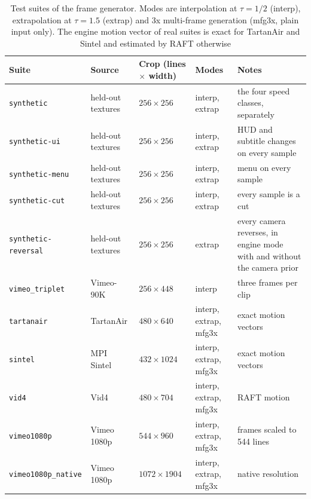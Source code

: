 \begin{table}[!htbp]
\caption{Test suites of the frame generator. Modes are interpolation at $\tau=1/2$ (interp), extrapolation at $\tau=1.5$ (extrap) and 3x multi-frame generation (mfg3x, plain input only). The engine motion vector of real suites is exact for TartanAir and Sintel and estimated by RAFT otherwise}\label{tab:fgm-suites}
{\footnotesize\setlength{\tabcolsep}{3pt}\raggedright\begin{tabular*}{\textwidth}{@{\extracolsep\fill}p{}p{}p{}p{}p{}}
\toprule
Suite & Source & Crop (lines $\times$ width) & Modes & Notes \\
\midrule
\texttt{synthetic} & held-out textures & $256\times256$ & interp, extrap & the four speed classes, separately \\
\texttt{synthetic-ui} & held-out textures & $256\times256$ & interp, extrap & HUD and subtitle changes on every sample \\
\texttt{synthetic-menu} & held-out textures & $256\times256$ & interp, extrap & menu on every sample \\
\texttt{synthetic-cut} & held-out textures & $256\times256$ & interp, extrap & every sample is a cut \\
\texttt{synthetic-reversal} & held-out textures & $256\times256$ & extrap & every camera reverses, in engine mode with and without the camera prior \\
\texttt{vimeo\_triplet} & Vimeo-90K & $256\times448$ & interp & three frames per clip \\
\texttt{tartanair} & TartanAir & $480\times640$ & interp, extrap, mfg3x & exact motion vectors \\
\texttt{sintel} & MPI Sintel & $432\times1024$ & interp, extrap, mfg3x & exact motion vectors \\
\texttt{vid4} & Vid4 & $480\times704$ & interp, extrap, mfg3x & RAFT motion \\
\texttt{vimeo1080p} & Vimeo 1080p & $544\times960$ & interp, extrap, mfg3x & frames scaled to 544 lines \\
\texttt{vimeo1080p\_native} & Vimeo 1080p & $1072\times1904$ & interp, extrap, mfg3x & native resolution \\
\bottomrule
\end{tabular*}}
\end{table}

